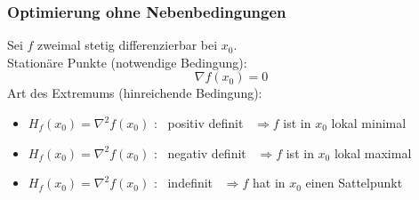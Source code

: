 \subsubsection{Optimierung ohne Nebenbedingungen} %
\label{ssub:optimierung_ohne_nebenbedingungen}
Sei $f$ zweimal stetig differenzierbar bei $x_0$.
\\Stationäre Punkte (notwendige Bedingung):
\begin{equation}
	\nabla f (x_0) = 0
\end{equation}
Art des Extremums (hinreichende Bedingung):

\begin{itemize}
	\item $H_f(x_0) = \nabla^2f(x_0)$ : \ positiv definit \  $\Rightarrow f $ ist in $ x_0 $ lokal minimal
	\item $H_f(x_0) = \nabla^2f(x_0)$ : \ negativ definit \  $\Rightarrow f $ ist in $ x_0 $ lokal maximal
	\item $H_f(x_0) = \nabla^2f(x_0)$ : \ indefinit \ $\Rightarrow f $ hat in $ x_0 $ einen Sattelpunkt
\end{itemize}
